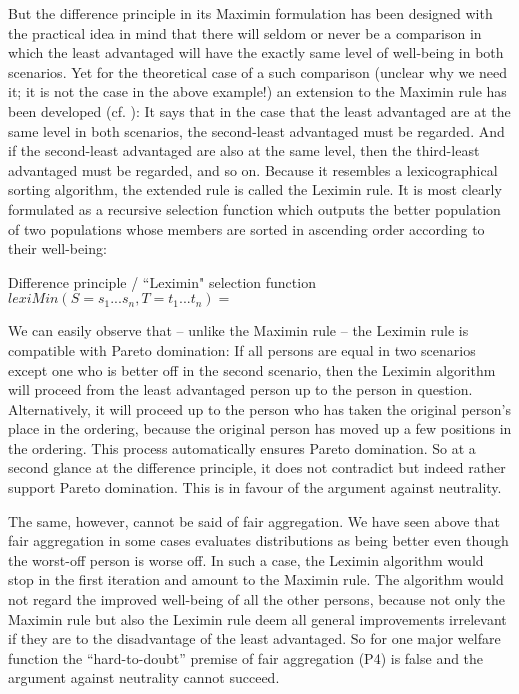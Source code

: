 But the difference principle in its Maximin formulation has been designed with the practical idea in mind that there will seldom or never be a comparison in which the least advantaged will have the exactly same level of well-being in both scenarios. Yet for the theoretical case of a such comparison (unclear why we need it; it is not the case in the above example!) an extension to the Maximin rule has been developed (cf. ): It says that in the case that the least advantaged are at the same level in both scenarios, the second-least advantaged must be regarded. And if the second-least advantaged are also at the same level, then the third-least advantaged must be regarded, and so on. Because it resembles a lexicographical sorting algorithm, the extended rule is called the Leximin rule. It is most clearly formulated as a recursive selection function which outputs the better population of two populations whose members are sorted in ascending order according to their well-being:  

\begin{Definition}{Difference principle / “Leximin" selection function}{}
$lexiMin( S=s_1...s_n, T=t_1...t_n) =$
\begin{comment}

 u(s1) {\textgreater} u(t1) & \{S\}\\  & ~  & u(t1) {\textgreater} u(s1) & \{T\}\\  &  &  & ~  & S = T = ${\emptyset}$ & \{S, T\}\\ \multicolumn{2}{m{3.583cm}}{with: 

u(s1) ${\leq}$ … ${\leq}$ u(sn) u(t1) \ ${\leq}$ … ${\leq}$ u(tn)} & ~  & ~  & u(t1) = u(s1) & lexiMin(s2...sn, t2...tn)
\end{comment}
\end{Definition}

We can easily observe that – unlike the Maximin rule – the Leximin rule is compatible with Pareto domination: If all persons are equal in two scenarios except one who is better off in the second scenario, then the Leximin algorithm will proceed from the least advantaged person up to the person in question. Alternatively, it will proceed up to the person who has taken the original person’s place in the ordering, because the original person has moved up a few positions in the ordering. This process automatically ensures Pareto domination. So at a second glance at the difference principle, it does not contradict but indeed rather support Pareto domination. This is in favour of the argument against neutrality.  

The same, however, cannot be said of fair aggregation. We have seen above that fair aggregation in some cases evaluates distributions as being better even though the worst-off person is worse off. In such a case, the Leximin algorithm would stop in the first iteration and amount to the Maximin rule. The algorithm would not regard the improved well-being of all the other persons, because not only the Maximin rule but also the Leximin rule deem all general improvements irrelevant if they are to the disadvantage of the least advantaged. So for one major welfare function the “hard-to-doubt” premise of fair aggregation (P4) is false and the argument against neutrality cannot succeed.  
